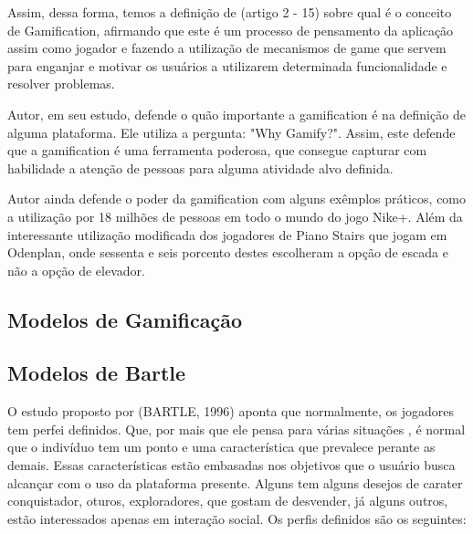 Assim, dessa forma, temos a definição de (artigo 2 - 15) sobre qual é o conceito de
Gamification, afirmando que este é um processo de pensamento da aplicação assim
como jogador e fazendo a utilização
de mecanismos de game que servem para enganjar e motivar os usuários a utilizarem
determinada funcionalidade e resolver problemas.

Autor, em seu estudo, defende o quão importante a gamification é na definição
de alguma plataforma. Ele utiliza a pergunta: "Why Gamify?". Assim, este defende
que a gamification é uma ferramenta poderosa, que consegue capturar com habilidade
a atenção de pessoas para alguma atividade alvo definida.

Autor ainda defende  o poder da gamification com alguns exêmplos práticos,
como a utilização por 18 milhões de pessoas em todo o mundo do jogo Nike+.
Além da interessante utilização modificada dos jogadores de
Piano Stairs que jogam em Odenplan, onde sessenta e seis porcento destes
escolheram a opção de escada e não a opção de elevador.

\subsection{Modelos de Gamificação}
\label{sub:modelogamification}

\subsection{Modelos de Bartle}
\label{sub:modeloBartle}
O estudo proposto por (BARTLE, 1996) aponta que normalmente, os jogadores
tem perfei definidos. Que, por mais que ele pensa para várias situações
, é normal que o indivíduo tem um ponto e uma característica que prevalece
perante as demais. Essas características estão embasadas nos objetivos
que o usuário  busca alcançar com o uso da plataforma presente. Alguns
tem alguns desejos de carater conquistador, oturos, exploradores, que gostam
de desvender, já alguns outros, estão interessados apenas em interação
social. Os perfis definidos são os seguintes:


